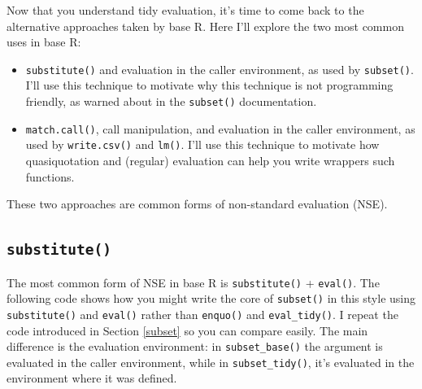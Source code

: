 \documentclass[]{book}
\makeatletter
\newcommand{\indexc}[1]{\index{#1@\texttt{#1}}}
\makeatother
\begin{document}

Now that you understand tidy evaluation, it's time to come back to the alternative approaches taken by base R. Here I'll explore the two most common uses in base R:

\begin{itemize}
\item
  \texttt{substitute()} and evaluation in the caller environment, as used by
  \texttt{subset()}. I'll use this technique to motivate why this technique is not
  programming friendly, as warned about in the \texttt{subset()} documentation.
\item
  \texttt{match.call()}, call manipulation, and evaluation in the caller environment,
  as used by \texttt{write.csv()} and \texttt{lm()}. I'll use this technique to motivate how
  quasiquotation and (regular) evaluation can help you write wrappers such
  functions.
\end{itemize}

These two approaches are common forms of non-standard evaluation (NSE).

\hypertarget{substitute}{%
\subsection{\texorpdfstring{\texttt{substitute()}}{substitute()}}\label{substitute}}

\indexc{substitute()}

The most common form of NSE in base R is \texttt{substitute()} + \texttt{eval()}. The following code shows how you might write the core of \texttt{subset()} in this style using \texttt{substitute()} and \texttt{eval()} rather than \texttt{enquo()} and \texttt{eval\_tidy()}. I repeat the code introduced in Section \ref{subset} so you can compare easily. The main difference is the evaluation environment: in \texttt{subset\_base()} the argument is evaluated in the caller environment, while in \texttt{subset\_tidy()}, it's evaluated in the environment where it was defined.
\end{document}
